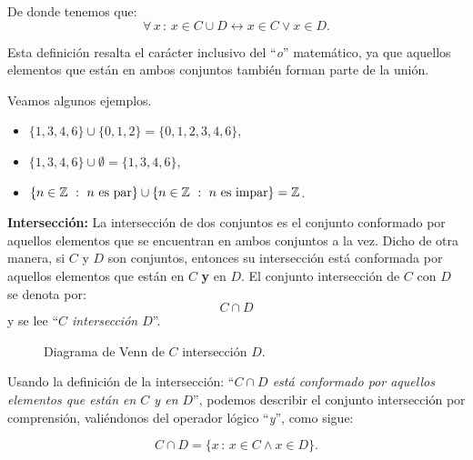 De donde tenemos que:
$$\forall\, x\,:\, 
x\in C\cup  D\leftrightarrow x\in C\vee x\in D.$$

Esta definición resalta el carácter inclusivo del ``{\em o}'' matemático, 
ya que aquellos elementos que están en ambos conjuntos 
también forman parte de la unión.

\medskip


\begin{ejemplo}
	Veamos algunos ejemplos.
	\begin{itemize}
		\item $\{1,3,4,6\}\cup\{ 0,1,2\}=\{0,1,2,3,4,6\}$,
		\item $\{1,3,4,6\}\cup\emptyset = \{1,3,4,6\}$,
		\item $\{n\in\mathbb{Z}\ :\ n\textrm{ es par}\}
			\cup\{ n\in\mathbb{Z}\ :\ n\textrm{ es impar}\}=\mathbb{Z}$.
	\end{itemize}
\end{ejemplo}

\textbf{Intersección:} La intersección de dos conjuntos es 
el conjunto conformado por aquellos elementos que se 
encuentran en ambos conjuntos a la vez. Dicho de otra manera, 
si $C$ y $D$ son conjuntos, entonces su intersección 
está conformada por aquellos elementos que están en $C$ \textbf{y} 
en $D$.
El conjunto intersección de $C$ con $D$ se denota por:
$$ C\cap  D$$ y se lee ``{\em $C$ intersección $D$}''.

\begin{center}
	\begin{figure}[h!]
		\begin{center}
		\end{center}
		\caption{Diagrama de Venn de  $C$ intersección $D$.}
	\end{figure}
\end{center}

Usando la definición de la intersección: ``{\em $C\cap D$ 
	está conformado por aquellos elementos que están en $C$ y en $D$}'', 
podemos describir el conjunto intersección por comprensi\'on, 
valiéndonos del operador lógico ``{\em y}'', como sigue:

$$C\cap  D=\{ x\,:\,x\in C\wedge x\in D\}.$$

